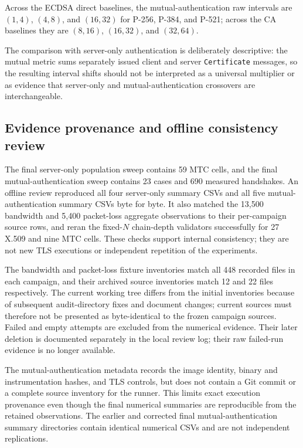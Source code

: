 \documentclass[journal]{IEEEtran}
\begin{document}
Across the ECDSA direct baselines, the mutual-authentication raw intervals are $(1,4)$, $(4,8)$, and $(16,32)$ for P-256, P-384, and P-521; across the CA baselines they are $(8,16)$, $(16,32)$, and $(32,64)$.

The comparison with server-only authentication is deliberately descriptive: the mutual metric sums separately issued client and server \texttt{Certificate} messages, so the resulting interval shifts should not be interpreted as a universal multiplier or as evidence that server-only and mutual-authentication crossovers are interchangeable.

\subsection{Evidence provenance and offline consistency review}
\label{sec:evidence-review}

The final server-only population sweep contains 59 MTC cells, and the final mutual-authentication sweep contains 23 cases and 690 measured handshakes. An offline review reproduced all four server-only summary CSVs and all five mutual-authentication summary CSVs byte for byte. It also matched the 13,500 bandwidth and 5,400 packet-loss aggregate observations to their per-campaign source rows, and reran the fixed-$N$ chain-depth validators successfully for 27 X.509 and nine MTC cells. These checks support internal consistency; they are not new TLS executions or independent repetition of the experiments.

The bandwidth and packet-loss fixture inventories match all 448 recorded files in each campaign, and their archived source inventories match 12 and 22 files respectively. The current working tree differs from the initial inventories because of subsequent audit-directory fixes and document changes; current sources must therefore not be presented as byte-identical to the frozen campaign sources. Failed and empty attempts are excluded from the numerical evidence. Their later deletion is documented separately in the local review log; their raw failed-run evidence is no longer available.

The mutual-authentication metadata records the image identity, binary and instrumentation hashes, and TLS controls, but does not contain a Git commit or a complete source inventory for the runner. This limits exact execution provenance even though the final numerical summaries are reproducible from the retained observations. The earlier and corrected final mutual-authentication summary directories contain identical numerical CSVs and are not independent replications.
\end{document}
